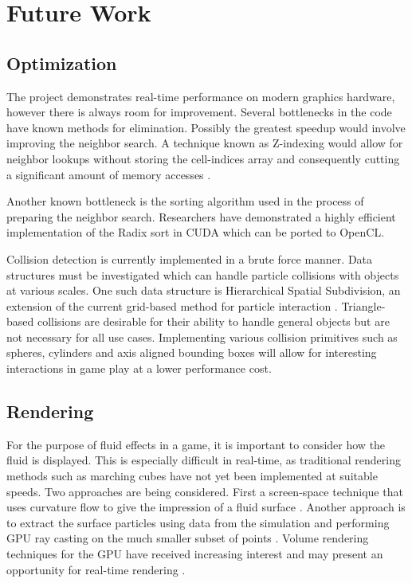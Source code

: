 \chapter{Future Work}

\section{Optimization}

The project demonstrates real-time performance on modern graphics hardware,
however there is always room for improvement. Several bottlenecks in the code
have known methods for elimination. Possibly the greatest speedup would involve
improving the neighbor search. A technique known as Z-indexing would allow for
neighbor lookups without storing the cell-indices array and consequently
cutting a significant amount of memory accesses \cite{Goswami2010}.


Another known bottleneck is the sorting algorithm used in the process of
preparing the neighbor search. Researchers have demonstrated a highly efficient
implementation of the Radix sort in CUDA \cite{Merrill:Sorting:2010} which can be ported to OpenCL.


Collision detection is currently implemented in a brute force manner. Data
structures must be investigated which can handle particle collisions with
objects at various scales. One such data structure is Hierarchical Spatial
Subdivision, an extension of the current grid-based method for particle
interaction \cite{Pouchol2009}. Triangle-based collisions are desirable for
their ability to handle general objects but are not necessary for all use
cases. Implementing various collision primitives such as spheres, cylinders and
axis aligned bounding boxes will allow for interesting interactions in game
play at a lower performance cost. 


\section{Rendering}
For the purpose of fluid effects in a game, it is important to consider how the
fluid is displayed. This is especially difficult in real-time, as traditional
rendering methods such as marching cubes have not yet been implemented at
suitable speeds.
Two approaches are being considered. First a screen-space technique that uses
curvature flow to give the impression of a fluid surface \cite{VanderLaan2009}.
Another approach is to extract the surface particles using data from the
simulation and performing GPU ray casting on the much smaller subset of
points \cite{Goswami2010}. Volume rendering techniques for the GPU have received
increasing interest and may present an opportunity for real-time
rendering \cite{Fraedrich2010}.


